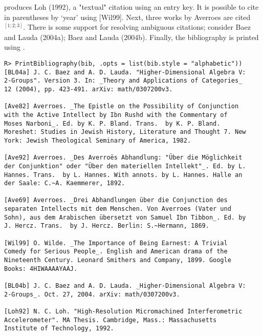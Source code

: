 \documentclass[article]{jss}\usepackage[]{graphicx}\usepackage[]{color}
\makeatletter
\newenvironment{kframe}{%
 \def\at@end@of@kframe{}%
 \ifinner\ifhmode%
  \def\at@end@of@kframe{\end{minipage}}%
  \begin{minipage}{\columnwidth}%
 \fi\fi%
 \def\FrameCommand##1{\hskip\@totalleftmargin \hskip-\fboxsep
 \colorbox{shadecolor}{##1}\hskip-\fboxsep
     \hskip-\linewidth \hskip-\@totalleftmargin \hskip\columnwidth}%
 \MakeFramed {\advance\hsize-\width
   \@totalleftmargin\z@ \linewidth\hsize
   \@setminipage}}%
 {\par\unskip\endMakeFramed%
 \at@end@of@kframe}
\newenvironment{knitrout}{}{} %
\makeatother
\begin{document}
 produces Loh (1992), a "textual" citation using an entry key.  It is possible to cite in parentheses by `year' using  [Wil99].  Next, three works by Averroes are cited  $^{[1; 2; 3]}$.  There is some support for resolving ambiguous citations; consider  Baez and Lauda (2004a); Baez and Lauda (2004b).  Finally, the bibliography is printed using .
\begin{knitrout}
\color{fgcolor}\begin{kframe}
\begin{verbatim}
R> PrintBibliography(bib, .opts = list(bib.style = "alphabetic"))
[BL04a] J. C. Baez and A. D. Lauda. "Higher-Dimensional Algebra V:
2-Groups". Version 3. In: _Theory and Applications of Categories_
12 (2004), pp. 423-491. arXiv: math/0307200v3.

[Ave82] Averroes. _The Epistle on the Possibility of Conjunction
with the Active Intellect by Ibn Rushd with the Commentary of
Moses Narboni_. Ed. by K. P. Bland. Trans.  by K. P. Bland.
Moreshet: Studies in Jewish History, Literature and Thought 7. New
York: Jewish Theological Seminary of America, 1982.

[Ave92] Averroes. _Des Averroës Abhandlung: "Über die Möglichkeit
der Conjunktion" oder "Über den materiellen Intellekt"_. Ed. by L.
Hannes. Trans.  by L. Hannes. With annots. by L. Hannes. Halle an
der Saale: C.~A. Kaemmerer, 1892.

[Ave69] Averroes. _Drei Abhandlungen über die Conjunction des
separaten Intellects mit dem Menschen. Von Averroes (Vater und
Sohn), aus dem Arabischen übersetzt von Samuel Ibn Tibbon_. Ed. by
J. Hercz. Trans.  by J. Hercz. Berlin: S.~Hermann, 1869.

[Wil99] O. Wilde. _The Importance of Being Earnest: A Trivial
Comedy for Serious People_. English and American drama of the
Nineteenth Century. Leonard Smithers and Company, 1899. Google
Books: 4HIWAAAAYAAJ.

[BL04b] J. C. Baez and A. D. Lauda. _Higher-Dimensional Algebra V:
2-Groups_. Oct. 27, 2004. arXiv: math/0307200v3.

[Loh92] N. C. Loh. "High-Resolution Micromachined Interferometric
Accelerometer". MA Thesis. Cambridge, Mass.: Massachusetts
Institute of Technology, 1992.
\end{verbatim}
\end{kframe}
\end{knitrout}
\end{document}
